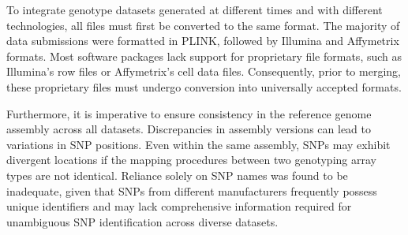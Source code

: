 \documentclass[a4paper,num-refs,gigabyte]{oup-contemporary}
\begin{document}
To integrate genotype datasets generated at different times and with different technologies, all files must first be converted to the same format. The majority of data submissions were formatted in PLINK\citep{Purcell2007}, followed by Illumina and Affymetrix formats. Most software packages lack support for proprietary file formats, such as Illumina’s row files or Affymetrix’s cell data files. Consequently, prior to merging, these proprietary files must undergo conversion into universally accepted formats.

Furthermore, it is imperative to ensure consistency in the reference genome assembly across all datasets. Discrepancies in assembly versions can lead to variations in SNP positions. Even within the same assembly, SNPs may exhibit divergent locations if the mapping procedures between two genotyping array types are not identical\citep{Fadista2012,Gershoni2022}. Reliance solely on SNP names was found to be inadequate, given that SNPs from different manufacturers frequently possess unique identifiers and may lack comprehensive information required for unambiguous SNP identification across diverse datasets.
\end{document}
